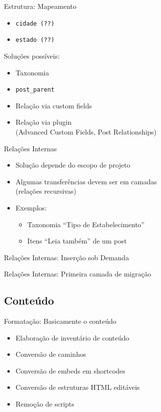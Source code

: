 \documentclass{beamer}
\begin{document}
\begin{frame}{Estrutura: Mapeamento}
  \begin{itemize}
    \item \texttt{cidade (??)}
    \item \texttt{estado (??)}
  \end{itemize}
  \pause Soluções possíveis:
  \begin{itemize}
    \item Taxonomia
    \item \texttt{post\_parent}
    \item Relação via custom fields
    \item Relação via plugin \\
          (Advanced Custom Fields, Post Relationships)
  \end{itemize}
\end{frame}

\begin{frame}{Relações Internas}
  \begin{itemize}
    \pause \item Solução depende do escopo de projeto
    \pause \item Algumas transferências devem ser em camadas \\
                 (relações recursivas)
    \pause \item Exemplos:
    \begin{itemize}
      \pause \item Taxonomia ``Tipo de Estabelecimento''
      \pause \item Itens ``Leia também'' de um post
    \end{itemize}
  \end{itemize}
\end{frame}

\begin{frame}{Relações Internas: Inserção sob Demanda}
  
\end{frame}

\begin{frame}{Relações Internas: Primeira camada de migração}
  
\end{frame}


\subsection{Conteúdo}

\begin{frame}{Formatação: Basicamente o conteúdo}
  \begin{itemize}
    \item Elaboração de inventário de conteúdo
    \item Conversão de caminhos
    \item Conversão de embeds em shortcodes
    \item Conversão de estruturas HTML editáveis
    \item Remoção de scripts
  \end{itemize}
\end{frame}
\end{document}
